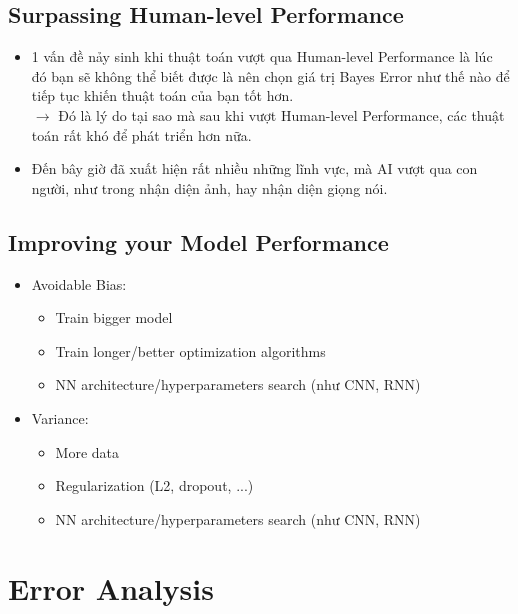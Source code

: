 \documentclass[12pt,a4paper]{report}
\begin{document}
	\section{Surpassing Human-level Performance}
		\begin{itemize}
			\item 1 vấn đề nảy sinh khi thuật toán vượt qua Human-level Performance là lúc đó bạn sẽ không thể biết được là nên chọn giá trị Bayes Error như thế nào để tiếp tục khiến thuật toán của bạn tốt hơn.\\$\rightarrow$ Đó là lý do tại sao mà sau khi vượt Human-level Performance, các thuật toán rất khó để phát triển hơn nữa.
			\item Đến bây giờ đã xuất hiện rất nhiều những lĩnh vực, mà AI vượt qua con người, như trong nhận diện ảnh, hay nhận diện giọng nói.
		\end{itemize}
	\section{Improving your Model Performance}
		\begin{itemize}
			\item Avoidable Bias:	
				\begin{itemize}
					\item Train bigger model
					\item Train longer/better optimization algorithms
					\item NN architecture/hyperparameters search (như CNN, RNN)					
				\end{itemize}
			\item Variance:
				\begin{itemize}
					\item More data
					\item Regularization (L2, dropout, ...)
					\item NN architecture/hyperparameters search (như CNN, RNN)					
				\end{itemize}
		\end{itemize}
\chapter{Error Analysis}
\end{document}
